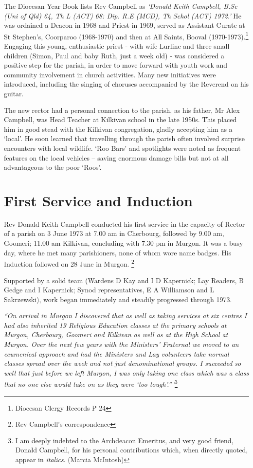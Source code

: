 The Diocesan Year Book lists Rev Campbell as \emph{`Donald Keith Campbell, B.Sc (Uni of Qld) 64, Th L (ACT) 68: Dip. R.E (MCD), Th Schol (ACT) 1972.'} He was ordained a Deacon in 1968 and Priest in 1969, served as Assistant Curate at St Stephen's, Coorparoo (1968-1970) and then at All Saints, Booval (1970-1973).\footnote{Diocesan Clergy Records P 24} Engaging this young, enthusiastic priest - with wife Lurline and three small children (Simon, Paul and baby Ruth, just a week old) - was considered a positive step for the parish, in order to move forward with youth work and community involvement in church activities. Many new initiatives were introduced, including the singing of choruses accompanied by the Reverend on his guitar.


The new rector had a personal connection to the parish, as his father, Mr Alex Campbell, was Head Teacher at Kilkivan school in the late 1950s. This placed him in good stead with the Kilkivan congregation, gladly accepting him as a `local'. He soon learned that travelling through the parish often involved surprise encounters with local wildlife. `Roo Bars' and spotlights were noted as frequent features on the local vehicles -- saving enormous damage bills but not at all advantageous to the poor `Roos'.



\section{First Service and Induction}



Rev Donald Keith Campbell conducted his first service in the capacity of Rector of a parish on 3 June 1973 at 7.00 am in Cherbourg, followed by 9.00 am, Goomeri; 11.00 am Kilkivan, concluding with 7.30 pm in Murgon. It was a busy day, where he met many parishioners, none of whom wore name badges. His Induction followed on 28 June in Murgon. \footnote{Rev Campbell's correspondence}


Supported by a solid team (Wardens D Kay and I D Kapernick; Lay Readers, B Gedge and I Kapernick; Synod representatives, E A Williamson and L Sakrzewski), work began immediately and steadily progressed through 1973.



\emph{``On arrival in Murgon I discovered that as well as taking services at six centres I had also inherited 19 Religious Education classes at the primary schools at Murgon, Cherbourg, Goomeri and Kilkivan as well as at the High School at Murgon. Over the next few years with the Ministers' Fraternal we moved to an ecumenical approach and had the Ministers and Lay volunteers take normal classes spread over the week and not just denominational groups. I succeeded so well that just before we left Murgon, I was only taking one class which was a class that no one else would take on as they were `too tough'.''\,'}\footnote{I am deeply indebted to the Archdeacon Emeritus, and very good friend, Donald Campbell, for his personal contributions which, when directly quoted, appear in \emph{italics}. (Marcia McIntosh)}


